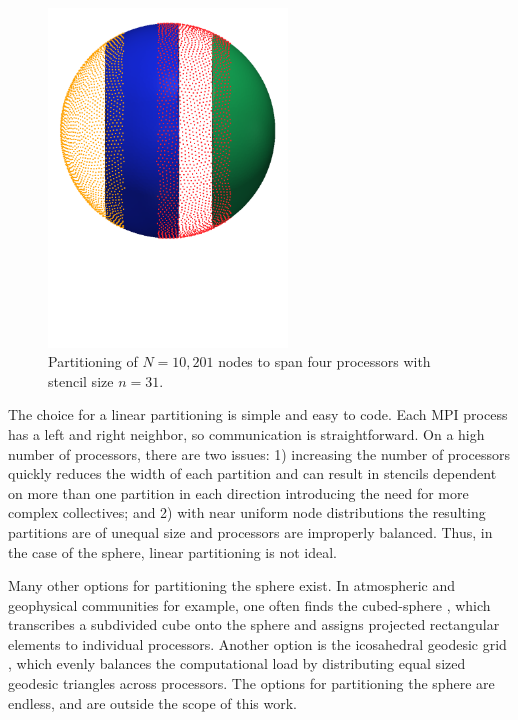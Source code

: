 \documentclass{report}
\begin{document}
\begin{figure}[ht!]
\begin{center}
\includegraphics[width=2.5in]{../figures/paper1/figures/vortex_rollup/4procs_N10K_n31.pdf}
\caption{Partitioning of $N=10,201$ nodes to span four processors with stencil size $n=31$. }
\label{fig:decomposed_sphere}
\end{center}
\end{figure}

The choice for a linear partitioning is simple and easy to code. Each MPI process has a left and right neighbor, so communication is straightforward. On a high number of processors, there are two issues: 1) increasing the number of processors quickly reduces the width of each partition and can result in stencils dependent on more than one partition in each direction introducing the need for more complex collectives; and 2) with near uniform node distributions the resulting partitions are of unequal size and processors are improperly balanced. Thus, in the case of the sphere, linear partitioning is not ideal. 


Many other options for partitioning the sphere exist. In atmospheric and geophysical communities for example, one often finds the cubed-sphere \cite{Ivan2011, Katta2012}, which transcribes a subdivided cube onto the sphere and assigns projected rectangular elements to individual processors. Another option is the icosahedral geodesic grid \cite{Randall2002}, which evenly balances the computational load by distributing equal sized geodesic triangles across processors. The options for partitioning the sphere are endless, and are outside the scope of this work. 
\end{document}
